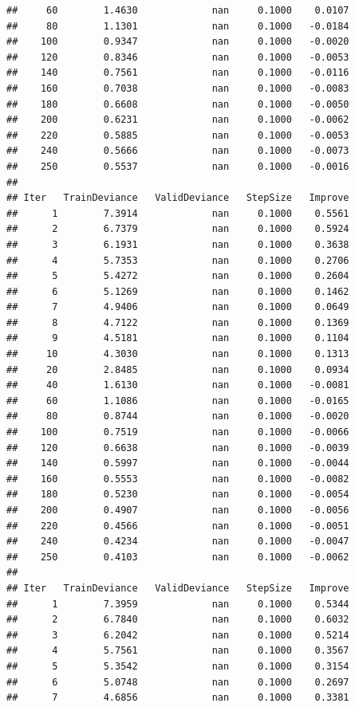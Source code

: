 \documentclass[
]{book}
\begin{document}
\begin{verbatim}
##     60        1.4630             nan     0.1000    0.0107
##     80        1.1301             nan     0.1000   -0.0184
##    100        0.9347             nan     0.1000   -0.0020
##    120        0.8346             nan     0.1000   -0.0053
##    140        0.7561             nan     0.1000   -0.0116
##    160        0.7038             nan     0.1000   -0.0083
##    180        0.6608             nan     0.1000   -0.0050
##    200        0.6231             nan     0.1000   -0.0062
##    220        0.5885             nan     0.1000   -0.0053
##    240        0.5666             nan     0.1000   -0.0073
##    250        0.5537             nan     0.1000   -0.0016
## 
## Iter   TrainDeviance   ValidDeviance   StepSize   Improve
##      1        7.3914             nan     0.1000    0.5561
##      2        6.7379             nan     0.1000    0.5924
##      3        6.1931             nan     0.1000    0.3638
##      4        5.7353             nan     0.1000    0.2706
##      5        5.4272             nan     0.1000    0.2604
##      6        5.1269             nan     0.1000    0.1462
##      7        4.9406             nan     0.1000    0.0649
##      8        4.7122             nan     0.1000    0.1369
##      9        4.5181             nan     0.1000    0.1104
##     10        4.3030             nan     0.1000    0.1313
##     20        2.8485             nan     0.1000    0.0934
##     40        1.6130             nan     0.1000   -0.0081
##     60        1.1086             nan     0.1000   -0.0165
##     80        0.8744             nan     0.1000   -0.0020
##    100        0.7519             nan     0.1000   -0.0066
##    120        0.6638             nan     0.1000   -0.0039
##    140        0.5997             nan     0.1000   -0.0044
##    160        0.5553             nan     0.1000   -0.0082
##    180        0.5230             nan     0.1000   -0.0054
##    200        0.4907             nan     0.1000   -0.0056
##    220        0.4566             nan     0.1000   -0.0051
##    240        0.4234             nan     0.1000   -0.0047
##    250        0.4103             nan     0.1000   -0.0062
## 
## Iter   TrainDeviance   ValidDeviance   StepSize   Improve
##      1        7.3959             nan     0.1000    0.5344
##      2        6.7840             nan     0.1000    0.6032
##      3        6.2042             nan     0.1000    0.5214
##      4        5.7561             nan     0.1000    0.3567
##      5        5.3542             nan     0.1000    0.3154
##      6        5.0748             nan     0.1000    0.2697
##      7        4.6856             nan     0.1000    0.3381

\end{verbatim}
\end{document}
